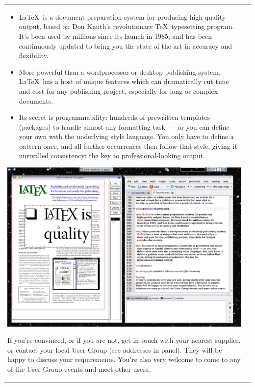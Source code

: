 \documentclass[fleqn]{article}
\begin{document}
\begin{tabular}{@{}
                         p{}%
		         @{\hspace{.04\columnwidth}}%
		         p{}%
		         @{}%
}
\begin{itemize}[noitemsep]

\item \LaTeX\ is a document preparation system for producing
  high-quality output, based on Don Knuth's revolutionary
  \TeX\ typesetting program. It's been used by millions since its
  launch in 1985, and has been continuously updated to bring you the
  state of the art in accuracy and flexibility.

\item More powerful than a wordprocessor or desktop publishing system,
  \LaTeX\ has a host of unique features which can dramatically cut
  time and cost for any publishing project, especially for long or
  complex documents.

\item Its secret is programmability: hundreds of prewritten templates
  (packages) to handle almost any formatting task~--- or you can
  define your own with the underlying style language. You only have to
  define a pattern once, and all further occurrences then follow that
  style, giving it unrivalled consistency: the key to
  professional-looking output.

\end{itemize}

\includegraphics[width=.58\columnwidth]{fullscreen}

\bigskip
If you're convinced, or if you are not, get in touch with your nearest
supplier, or contact your local User Group (see addresses in panel).
They will be happy to discuss your requirements. You're also very
welcome to come to any of the User Group events and meet other users.

\end{tabular}

\clearpage

%
%
\end{document}
